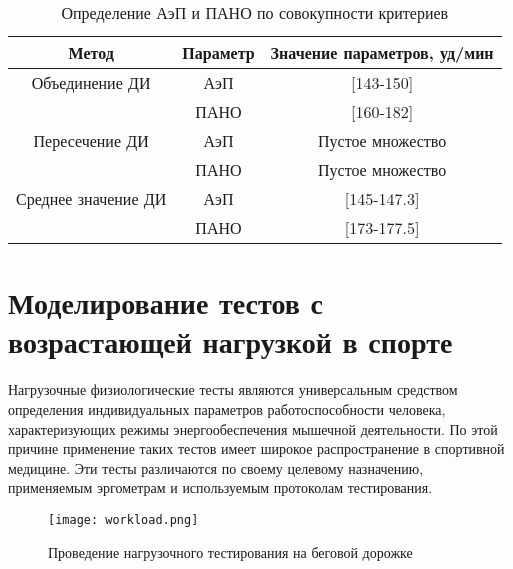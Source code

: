 \begin{table}[!ht]
\centering
\caption{Определение АэП и ПАНО по совокупности критериев}
\medskip
\label{tabular:lt3}
\begin{tabular}{|c|c|c|}
\hline
Метод & Параметр & Значение параметров, уд/мин \\
\hline
Объединение ДИ & АэП & [143-150] \\
\hline
 & ПАНО & [160-182] \\
\hline
Пересечение ДИ & АэП & Пустое множество \\
\hline
 & ПАНО &  Пустое множество \\
\hline
Среднее значение ДИ & АэП & [145-147.3] \\
\hline
 & ПАНО & [173-177.5] \\
\hline
\end{tabular}
\end{table}

\section{Моделирование тестов с возрастающей нагрузкой в спорте}
\label{sec:loadTests}

Нагрузочные физиологические тесты являются универсальным средством определения индивидуальных параметров работоспособности человека, характеризующих режимы энергообеспечения мышечной деятельности. По этой причине применение таких тестов имеет широкое распространение в спортивной медицине. Эти тесты различаются по своему целевому назначению, применяемым эргометрам и используемым протоколам тестирования. 

\begin{figure}[!ht]
	\centering
	\texttt{[image: workload.png]}
	\caption{Проведение нагрузочного тестирования на беговой дорожке} 
\end{figure}

